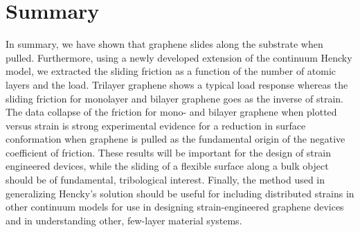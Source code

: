 \section{Summary}
In summary, we have shown that graphene slides along the substrate when pulled.  Furthermore, using a newly developed extension of the continuum Hencky model, we extracted the sliding friction as a function of the number of atomic layers and the load.  Trilayer graphene shows a typical load response whereas the sliding friction for monolayer and bilayer graphene goes as the inverse of strain. The data collapse of the friction for mono- and bilayer graphene when plotted versus strain is strong experimental evidence for a reduction in surface conformation when graphene is pulled as the fundamental origin of the negative coefficient of friction.  These results will be important for the design of strain engineered devices\cite{Pereira2009a}, while the sliding of a flexible surface along a bulk object should be of fundamental, tribological interest. Finally, the method used in generalizing Hencky's solution should be useful for including distributed strains in other continuum models for use in designing strain-engineered graphene devices and in understanding other, few-layer material systems.